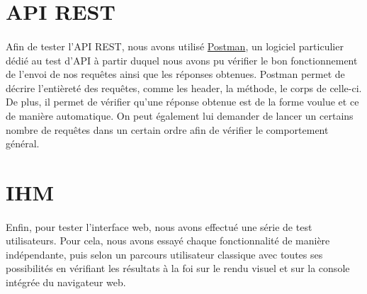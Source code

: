 \section{API REST}

\paragraph{}
Afin de tester l'API REST, nous avons utilisé \href{https://www.getpostman.com/}{Postman}, un logiciel particulier dédié au test d'API à partir duquel nous avons pu vérifier le bon fonctionnement de l'envoi de nos requêtes ainsi que les réponses obtenues. Postman permet de décrire l'entièreté des requêtes, comme les header, la méthode, le corps de celle-ci. De plus, il permet de vérifier qu'une réponse obtenue est de la forme voulue et ce de manière automatique. On peut également lui demander de lancer un certains nombre de requêtes dans un certain ordre afin de vérifier le comportement général.

\section{IHM}

\paragraph{}
Enfin, pour tester l'interface web, nous avons effectué une série de test utilisateurs. Pour cela, nous avons essayé chaque fonctionnalité de manière indépendante, puis selon un parcours utilisateur classique avec toutes ses possibilités en vérifiant les résultats à la foi sur le rendu visuel et sur la console intégrée du navigateur web.